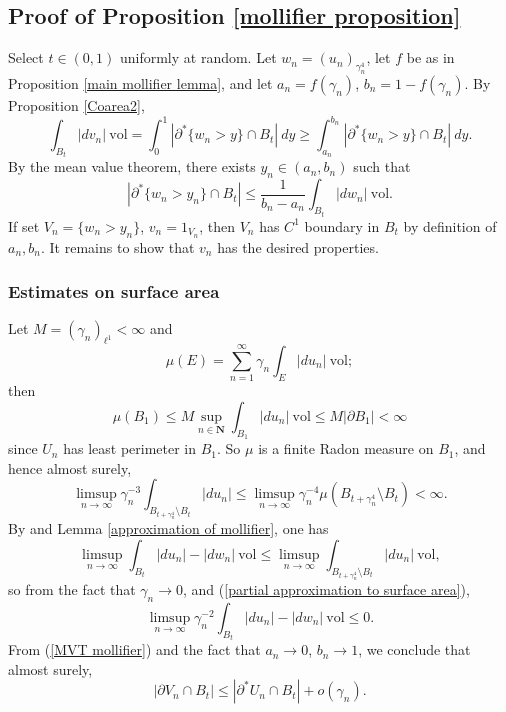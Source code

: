 \documentclass[reqno,12pt,letterpaper]{amsart}
\newcommand{\NN}{\mathbf{N}}
\newcommand{\vol}{\mathrm{vol}}
\theoremstyle{definition}
\numberwithin{equation}{section}
\begin{document}
\subsection{Proof of Proposition \ref{mollifier proposition}}
Select $t \in (0, 1)$ uniformly at random.
Let $w_n = (u_n)_{\gamma_n^4}$, let $f$ be as in Proposition \ref{main mollifier lemma}, and let $a_n = f(\gamma_n)$, $b_n = 1 - f(\gamma_n)$.
By Proposition \ref{Coarea2},
$$\int_{B_t} |dv_n| ~\vol = \int_0^1 |\partial^* \{w_n > y\} \cap B_t| ~dy \geq \int_{a_n}^{b_n} |\partial^* \{w_n > y\} \cap B_t| ~dy.$$
By the mean value theorem, there exists $y_n \in (a_n, b_n)$ such that
\begin{equation}\label{MVT mollifier}
|\partial^* \{w_n > y_n\} \cap B_t| \leq \frac{1}{b_n - a_n} \int_{B_t} |dw_n| ~\vol.
\end{equation}
If set $V_n = \{w_n > y_n\}$, $v_n = 1_{V_n}$, then $V_n$ has $C^1$ boundary in $B_t$ by definition of $a_n, b_n$.
It remains to show that $v_n$ has the desired properties.

\subsubsection{Estimates on surface area}
Let $M = (\gamma_n)_{\ell^1} < \infty$ and
$$\mu(E) = \sum_{n=1}^\infty \gamma_n \int_E |du_n| ~\vol;$$
then
$$\mu(B_1) \leq M\sup_{n \in \NN} \int_{B_1} |du_n| ~\vol \leq M |\partial B_1| < \infty$$
since $U_n$ has least perimeter in $B_1$.
So $\mu$ is a finite Radon measure on $B_1$, and hence almost surely,
\begin{equation}\label{partial approximation to surface area}
\limsup_{n \to \infty} \gamma_n^{-3} \int_{B_{t + \gamma_n^4} \setminus B_t} |du_n| \leq \limsup_{n \to \infty} \gamma_n^{-4} \mu(B_{t + \gamma_n^4} \setminus B_t) < \infty.
\end{equation}
By \cite[Lemma 7.2]{Giusti77} and Lemma \ref{approximation of mollifier}, one has
$$\limsup_{n \to \infty} \int_{B_t} |du_n| - |dw_n| ~\vol \leq \limsup_{n \to \infty} \int_{B_{t + \gamma_n^4} \setminus B_t} |du_n| ~\vol,$$
so from the fact that $\gamma_n \to 0$, and (\ref{partial approximation to surface area}),
$$\limsup_{n \to \infty} \gamma_n^{-2} \int_{B_t} |du_n| - |dw_n| ~\vol \leq 0.$$
From (\ref{MVT mollifier}) and the fact that $a_n \to 0$, $b_n \to 1$, we conclude that almost surely,
\begin{equation}\label{approximation of surface area}
|\partial V_n \cap B_t| \leq |\partial^* U_n \cap B_t| + o(\gamma_n).
\end{equation}
\end{document}
